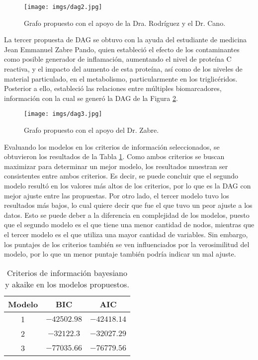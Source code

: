\documentclass[12pt, letterpaper]{report}
\begin{document}
\begin{figure}[H]
    \centering
    \texttt{[image: imgs/dag2.jpg]}
    \caption{Grafo propuesto con el apoyo de la Dra. Rodríguez y el Dr. Cano.}
    \label{fig:dag2}
\end{figure}

La tercer propuesta de DAG se obtuvo con la ayuda del estudiante de medicina Jean Emmanuel Zabre Pando, quien estableció el efecto de los contaminantes como posible generador de inflamación, aumentando el nivel de proteína C reactiva, y el impacto del aumento de esta proteína, así como de los niveles de material particulado, en el metabolismo, particularmente en los triglicéridos. Posterior a ello, estableció las relaciones entre múltiples biomarcadores, información con la cual se generó la DAG de la Figura \ref{fig:dag3}.

\begin{figure}[H]
    \centering
    \texttt{[image: imgs/dag3.jpg]}
    \caption{Grafo propuesto con el apoyo del Dr. Zabre.}
    \label{fig:dag3}
\end{figure}

Evaluando los modelos en los criterios de información seleccionados, se obtuvieron los resultados de la Tabla \ref{tab:scores}. Como ambos criterios se buscan maximizar para determinar un mejor modelo, los resultados muestran ser consistentes entre ambos criterios. Es decir, se puede concluir que el segundo modelo resultó en los valores más altos de los criterios, por lo que es la DAG con mejor ajuste entre las propuestas. Por otro lado, el tercer modelo tuvo los resultados más bajos, lo cual quiere decir que fue el que tuvo un peor ajuste a los datos. Esto se puede deber a la diferencia en complejidad de los modelos, puesto que el segundo modelo es el que tiene una menor cantidad de nodos, mientras que el tercer modelo es el que utiliza una mayor cantidad de variables. Sin embargo, los puntajes de los criterios también se ven influenciados por la verosimilitud del modelo, por lo que un menor puntaje también podría indicar un mal ajuste.

\begin{table}[H]
    \centering
    \begin{tabular}{|c|c|c|}
        \hline
        Modelo & BIC & AIC \\
        \hline
        1 & $-42502.98$ & $-42418.14$ \\
        \hline
        2 & $-32122.3$ & $-32027.29$ \\
        \hline
        3 & $-77035.66$ & $-76779.56$ \\
        \hline
    \end{tabular}
    \caption{Criterios de información bayesiano y akaike en los modelos propuestos.}
    \label{tab:scores}
\end{table}
\end{document}
